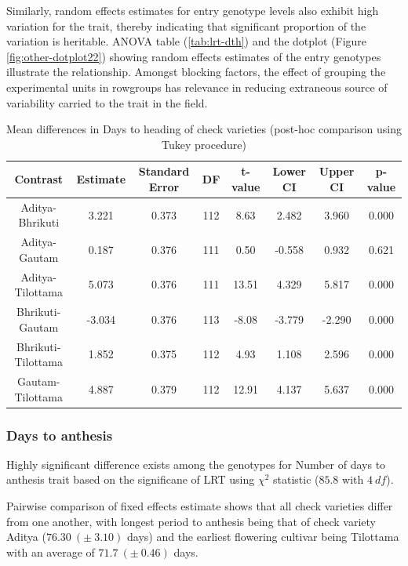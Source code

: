 \documentclass[12pt,oneside]{dukestatscithesis} %
\theoremstyle{definition}
\theoremstyle{definition}
\theoremstyle{definition}
\theoremstyle{remark}
\begin{document}
Similarly, random effects estimates for entry genotype levels also
exhibit high variation for the trait, thereby indicating that
significant proportion of the variation is heritable. ANOVA table
(\ref{tab:lrt-dth}) and the dotplot (Figure \ref{fig:other-dotplot22})
showing random effects estimates of the entry genotypes illustrate the
relationship. Amongst blocking factors, the effect of grouping the
experimental units in rowgroups has relevance in reducing extraneous
source of variability carried to the trait in the field.
\begin{table}[H]

\caption{\label{tab:other-meanconf-tab6}Mean differences in Days to heading of check varieties (post-hoc comparison using Tukey procedure)}
\centering
\begin{tabular}[t]{cccccccc}
\toprule
Contrast & Estimate & Standard Error & DF & t-value & Lower CI & Upper CI & p-value\\
\midrule
Aditya-Bhrikuti & 3.221 & 0.373 & 112 & 8.63 & 2.482 & 3.960 & 0.000\\
Aditya-Gautam & 0.187 & 0.376 & 111 & 0.50 & -0.558 & 0.932 & 0.621\\
Aditya-Tilottama & 5.073 & 0.376 & 111 & 13.51 & 4.329 & 5.817 & 0.000\\
Bhrikuti-Gautam & -3.034 & 0.376 & 113 & -8.08 & -3.779 & -2.290 & 0.000\\
Bhrikuti-Tilottama & 1.852 & 0.375 & 112 & 4.93 & 1.108 & 2.596 & 0.000\\
Gautam-Tilottama & 4.887 & 0.379 & 112 & 12.91 & 4.137 & 5.637 & 0.000\\
\bottomrule
\end{tabular}
\end{table}
\subsubsection{Days to anthesis}\label{days-to-anthesis}

Highly significant difference exists among the genotypes for Number of
days to anthesis trait based on the significane of LRT using \(\chi^2\)
statistic (\(85.8\) with \(4\ df\)).

Pairwise comparison of fixed effects estimate shows that all check
varieties differ from one another, with longest period to anthesis being
that of check variety Aditya (\(76.30\ (\pm\ 3.10)\) days) and the
earliest flowering cultivar being Tilottama with an average of
\(71.7\ (\pm\ 0.46)\) days.
\end{document}

